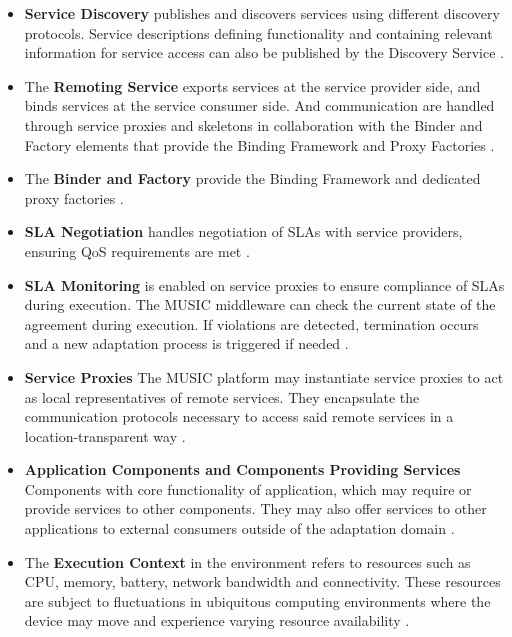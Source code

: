 \documentclass[conference]{IEEEtran}
\begin{document}
\begin{itemize}
	\item \textbf{Service Discovery} publishes and discovers services using different discovery protocols. Service descriptions defining functionality and containing relevant information for service access can also be published by the Discovery Service \cite{MUSIC_pdf}.

	\item The \textbf{Remoting Service} exports services at the service provider side, and binds services at the service consumer side. And communication are handled through service proxies and skeletons in collaboration with the Binder and Factory elements that provide the Binding Framework and Proxy Factories \cite{MUSIC_pdf}.

	\item The \textbf{Binder and Factory} provide the Binding Framework and dedicated proxy factories \cite{MUSIC_pdf}.

	\item  \textbf{SLA Negotiation} handles negotiation of SLAs with service providers, ensuring QoS requirements are met \cite{MUSIC_pdf}.

	\item  \textbf{SLA Monitoring} is enabled on service proxies to ensure compliance of SLAs during execution. The MUSIC middleware can check the current state of the agreement during execution. If violations are detected, termination occurs and a new adaptation process is triggered if needed \cite{MUSIC_pdf}.

	\item  \textbf{Service Proxies} The MUSIC platform may instantiate service proxies to act as local representatives of remote services. They encapsulate the communication protocols necessary to access said remote services in a location-transparent way \cite{MUSIC_pdf}.

	\item  \textbf{Application Components and Components Providing Services} Components with core functionality of application, which may require or provide services to other components. They may also offer services to other applications to external consumers outside of the adaptation domain \cite{MUSIC_pdf}.

	\item  The \textbf{Execution Context} in the environment refers to resources such as CPU, memory, battery, network bandwidth and connectivity. These resources are subject to fluctuations in ubiquitous computing environments where the device may move and experience varying resource availability \cite{MUSIC_pdf}.


\end{itemize}
\end{document}
